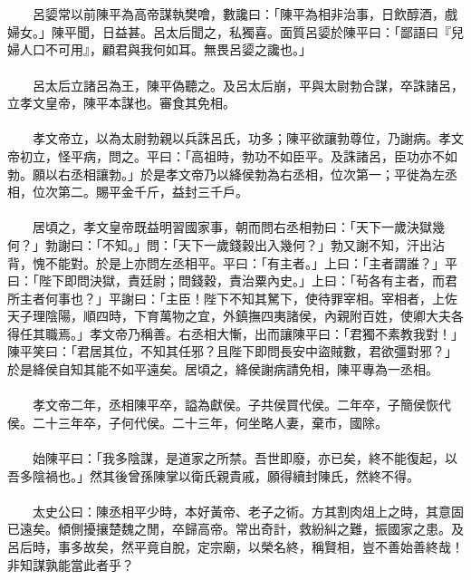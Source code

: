 \\\\
　　呂媭常以前陳平為高帝謀執樊噲，數讒曰：「陳平為相非治事，日飲醇酒，戲婦女。」陳平聞，日益甚。呂太后聞之，私獨喜。面質呂媭於陳平曰：「鄙語曰『兒婦人口不可用』，顧君與我何如耳。無畏呂媭之讒也。」
\\\\
　　呂太后立諸呂為王，陳平偽聽之。及呂太后崩，平與太尉勃合謀，卒誅諸呂，立孝文皇帝，陳平本謀也。審食其免相。
\\\\
　　孝文帝立，以為太尉勃親以兵誅呂氏，功多；陳平欲讓勃尊位，乃謝病。孝文帝初立，怪平病，問之。平曰：「高祖時，勃功不如臣平。及誅諸呂，臣功亦不如勃。願以右丞相讓勃。」於是孝文帝乃以絳侯勃為右丞相，位次第一；平徙為左丞相，位次第二。賜平金千斤，益封三千戶。
\\\\
　　居頃之，孝文皇帝既益明習國家事，朝而問右丞相勃曰：「天下一歲決獄幾何？」勃謝曰：「不知。」問：「天下一歲錢穀出入幾何？」勃又謝不知，汗出沾背，愧不能對。於是上亦問左丞相平。平曰：「有主者。」上曰：「主者謂誰？」平曰：「陛下即問決獄，責廷尉；問錢穀，責治粟內史。」上曰：「茍各有主者，而君所主者何事也？」平謝曰：「主臣！陛下不知其駑下，使待罪宰相。宰相者，上佐天子理陰陽，順四時，下育萬物之宜，外鎮撫四夷諸侯，內親附百姓，使卿大夫各得任其職焉。」孝文帝乃稱善。右丞相大慚，出而讓陳平曰：「君獨不素教我對！」陳平笑曰：「君居其位，不知其任邪？且陛下即問長安中盜賊數，君欲彊對邪？」於是絳侯自知其能不如平遠矣。居頃之，絳侯謝病請免相，陳平專為一丞相。
\\\\
　　孝文帝二年，丞相陳平卒，謚為獻侯。子共侯買代侯。二年卒，子簡侯恢代侯。二十三年卒，子何代侯。二十三年，何坐略人妻，棄市，國除。
\\\\
　　始陳平曰：「我多陰謀，是道家之所禁。吾世即廢，亦已矣，終不能復起，以吾多陰禍也。」然其後曾孫陳掌以衛氏親貴戚，願得續封陳氏，然終不得。
\\\\
　　太史公曰：陳丞相平少時，本好黃帝、老子之術。方其割肉俎上之時，其意固已遠矣。傾側擾攘楚魏之閒，卒歸高帝。常出奇計，救紛糾之難，振國家之患。及呂后時，事多故矣，然平竟自脫，定宗廟，以榮名終，稱賢相，豈不善始善終哉！非知謀孰能當此者乎？
